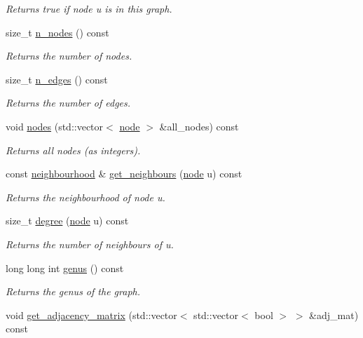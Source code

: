 \begin{DoxyCompactItemize}
\begin{DoxyCompactList}\small\item\em Returns true if node {\itshape u} is in this graph. \end{DoxyCompactList}\item 
size\-\_\-t \hyperlink{classlgraph_1_1xxgraph_a879c8fc141a2d7847ec4e192e3b415f5}{n\-\_\-nodes} () const 
\begin{DoxyCompactList}\small\item\em Returns the number of nodes. \end{DoxyCompactList}\item 
size\-\_\-t \hyperlink{classlgraph_1_1xxgraph_a8ca991d1521cb6ba77e1cd3494ab42be}{n\-\_\-edges} () const 
\begin{DoxyCompactList}\small\item\em Returns the number of edges. \end{DoxyCompactList}\item 
\hypertarget{classlgraph_1_1xxgraph_a27086830e76e7cf847ba0bc3c26fb0ee}{void \hyperlink{classlgraph_1_1xxgraph_a27086830e76e7cf847ba0bc3c26fb0ee}{nodes} (std\-::vector$<$ \hyperlink{namespacelgraph_a397169dd66adf725210a30fb7251773e}{node} $>$ \&all\-\_\-nodes) const }\label{classlgraph_1_1xxgraph_a27086830e76e7cf847ba0bc3c26fb0ee}

\begin{DoxyCompactList}\small\item\em Returns all nodes (as integers). \end{DoxyCompactList}\item 
const \hyperlink{namespacelgraph_a052e7766c13f3a43cec0aec8173fdede}{neighbourhood} \& \hyperlink{classlgraph_1_1xxgraph_a8b6d2d8126d39fc4167e9b93af78d5fc}{get\-\_\-neighbours} (\hyperlink{namespacelgraph_a397169dd66adf725210a30fb7251773e}{node} u) const 
\begin{DoxyCompactList}\small\item\em Returns the neighbourhood of node u. \end{DoxyCompactList}\item 
size\-\_\-t \hyperlink{classlgraph_1_1xxgraph_a3106eaa7cc937f414c2281e542264883}{degree} (\hyperlink{namespacelgraph_a397169dd66adf725210a30fb7251773e}{node} u) const 
\begin{DoxyCompactList}\small\item\em Returns the number of neighbours of u. \end{DoxyCompactList}\item 
long long int \hyperlink{classlgraph_1_1xxgraph_ae758b0403a8a1d9b82a8859608f4049c}{genus} () const 
\begin{DoxyCompactList}\small\item\em Returns the genus of the graph. \end{DoxyCompactList}\item 
\hypertarget{classlgraph_1_1xxgraph_a4161a548022795a068af53c76d504391}{void \hyperlink{classlgraph_1_1xxgraph_a4161a548022795a068af53c76d504391}{get\-\_\-adjacency\-\_\-matrix} (std\-::vector$<$ std\-::vector$<$ bool $>$ $>$ \&adj\-\_\-mat) const }\label{classlgraph_1_1xxgraph_a4161a548022795a068af53c76d504391}


\end{DoxyCompactItemize}
